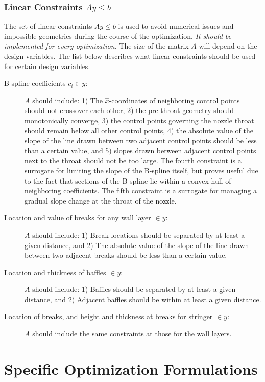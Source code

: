 \documentclass{article}
\begin{document}
\subsubsection{Linear Constraints $Ay \leq b$}

The set of linear constraints $Ay \leq b$ is used to avoid numerical issues and impossible geometries during the course of the optimization. \textit{It should be implemented for every optimization.} The size of the matrix $A$ will depend on the design variables. The list below describes what linear constraints should be used for certain design variables.

\begin{description}
\item[B-spline coefficients $c_i \in y$:] $A$ should include: 1) The $\hat{x}$-coordinates of neighboring control points should not crossover each other, 2) the pre-throat geometry should monotonically converge, 3) the control points governing the nozzle throat should remain below all other control points, 4) the absolute value of the slope of the line drawn between two adjacent control points should be less than a certain value, and 5) slopes drawn between adjacent control points next to the throat should not be too large. The fourth constraint is a surrogate for limiting the slope of the B-spline itself, but proves useful due to the fact that sections of the B-spline lie within a convex hull of neighboring coefficients. The fifth constraint is a surrogate for managing a gradual slope change at the throat of the nozzle.
\item[Location and value of breaks for any wall layer $\in y$:] $A$ should include: 1) Break locations should be separated by at least a given distance, and 2) The absolute value of the slope of the line drawn between two adjacent breaks should be less than a certain value.
\item[Location and thickness of baffles $\in y$:] $A$ should include: 1) Baffles should be separated by at least a given distance, and 2) Adjacent baffles should be within at least a given distance.
\item[Location of breaks, and height and thickness at breaks for stringer $\in y$:] $A$ should include the same constraints at those for the wall layers.
\end{description}

\section{Specific Optimization Formulations} \label{sec:specificOptimizationFormulations}
\end{document}
